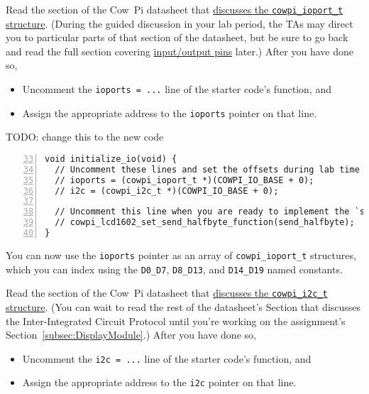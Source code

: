Read the section of the Cow~Pi datasheet that \href{https://cow-pi.readthedocs.io/en/latest/microcontroller.html#structure-for-memory-mapped-input-output}{discusses the \lstinline{cowpi_ioport_t} structure}.
(During the guided discussion in your lab period, the TAs may direct you to particular parts of that section of the datasheet,
but be sure to go back and read the full section covering \href{https://cow-pi.readthedocs.io/en/latest/microcontroller.html#external-pins-input-output}{input/output pins} later.)
After you have done so,
\begin{itemize}
    \item Uncomment the \lstinline{ioports = ...} line of the starter code's  function, and
    \item Assign the appropriate address to the \lstinline{ioports} pointer on that line.
\end{itemize}

{\color{red}TODO: change this to the new code}

\begin{lstlisting}[numberstyle=\color{gray}, numbers=left, firstnumber=33]
void initialize_io(void) {
  // Uncomment these lines and set the offsets during lab time
  // ioports = (cowpi_ioport_t *)(COWPI_IO_BASE + 0);
  // i2c = (cowpi_i2c_t *)(COWPI_IO_BASE + 0);

  // Uncomment this line when you are ready to implement the `send_halfbyte()` function
  // cowpi_lcd1602_set_send_halfbyte_function(send_halfbyte);
}
\end{lstlisting}

You can now use the \lstinline{ioports} pointer as an array of \lstinline{cowpi_ioport_t} structures, which you can index using the \lstinline{D0_D7}, \lstinline{D8_D13}, and \lstinline{D14_D19} named constants.

Read the section of the Cow~Pi datasheet that \href{https://cow-pi.readthedocs.io/en/latest/microcontroller.html#atmega328ptwistruct}{discusses the \lstinline{cowpi_i2c_t} structure}.
(You can wait to read the rest of the datasheet's Section that discusses the Inter-Integrated Circuit Protocol until you're working on the assignment's Section~\ref{subsec:DisplayModule}.)
After you have done so,
\begin{itemize}
    \item Uncomment the \lstinline{i2c = ...} line of the starter code's  function, and
    \item Assign the appropriate address to the \lstinline{i2c} pointer on that line.
\end{itemize}

